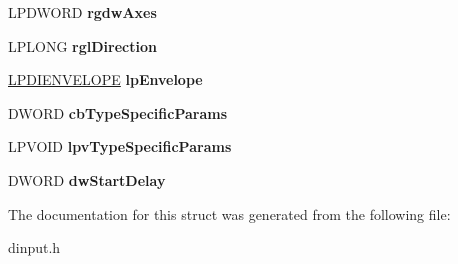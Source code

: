 \begin{DoxyCompactItemize}
\item 
\hypertarget{struct_d_i_e_f_f_e_c_t_af2d08938130f75e11fac0348abbe1e4e}{L\-P\-D\-W\-O\-R\-D {\bfseries rgdw\-Axes}}\label{struct_d_i_e_f_f_e_c_t_af2d08938130f75e11fac0348abbe1e4e}

\item 
\hypertarget{struct_d_i_e_f_f_e_c_t_a9ebd4888a32e17ecc9427acbe6ffa63f}{L\-P\-L\-O\-N\-G {\bfseries rgl\-Direction}}\label{struct_d_i_e_f_f_e_c_t_a9ebd4888a32e17ecc9427acbe6ffa63f}

\item 
\hypertarget{struct_d_i_e_f_f_e_c_t_a1d55b6f5b087be8a4610512d18520f33}{\hyperlink{struct_d_i_e_n_v_e_l_o_p_e}{L\-P\-D\-I\-E\-N\-V\-E\-L\-O\-P\-E} {\bfseries lp\-Envelope}}\label{struct_d_i_e_f_f_e_c_t_a1d55b6f5b087be8a4610512d18520f33}

\item 
\hypertarget{struct_d_i_e_f_f_e_c_t_af091a9ccd8d772e65159dda0b15750f8}{D\-W\-O\-R\-D {\bfseries cb\-Type\-Specific\-Params}}\label{struct_d_i_e_f_f_e_c_t_af091a9ccd8d772e65159dda0b15750f8}

\item 
\hypertarget{struct_d_i_e_f_f_e_c_t_a8b1994ee61dc5712f52b6fc1d77e28ac}{L\-P\-V\-O\-I\-D {\bfseries lpv\-Type\-Specific\-Params}}\label{struct_d_i_e_f_f_e_c_t_a8b1994ee61dc5712f52b6fc1d77e28ac}

\item 
\hypertarget{struct_d_i_e_f_f_e_c_t_ae8ec66d0f61f2a330de17abb59e4f4b4}{D\-W\-O\-R\-D {\bfseries dw\-Start\-Delay}}\label{struct_d_i_e_f_f_e_c_t_ae8ec66d0f61f2a330de17abb59e4f4b4}

\end{DoxyCompactItemize}


The documentation for this struct was generated from the following file\-:\begin{DoxyCompactItemize}
\item 
dinput.\-h\end{DoxyCompactItemize}

